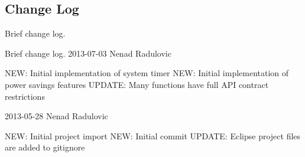 \hypertarget{group__changelog}{\subsection{Change Log}
\label{group__changelog}
}


Brief change log.  


Brief change log. 2013-\/07-\/03 Nenad Radulovic \begin{DoxyVerb}  NEW:      Initial implementation of system timer
  NEW:      Initial implementation of power savings features
  UPDATE:   Many functions have full API contract restrictions 
\end{DoxyVerb}


2013-\/05-\/28 Nenad Radulovic \begin{DoxyVerb}  NEW:      Initial project import
  NEW:      Initial commit
  UPDATE:   Eclipse project files are added to gitignore\end{DoxyVerb}
